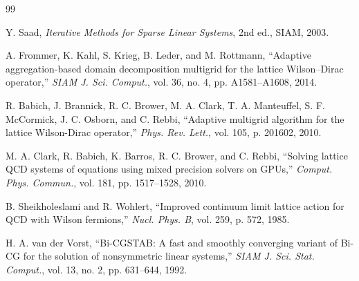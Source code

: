 \documentclass[11pt,a4paper]{article}
\begin{document}

\begin{thebibliography}{99}

Y. Saad, \textit{Iterative Methods for Sparse Linear Systems}, 2nd ed., SIAM, 2003.

A. Frommer, K. Kahl, S. Krieg, B. Leder, and M. Rottmann,
``Adaptive aggregation-based domain decomposition multigrid for the lattice Wilson--Dirac operator,''
\textit{SIAM J. Sci. Comput.}, vol. 36, no. 4, pp. A1581--A1608, 2014.

R. Babich, J. Brannick, R. C. Brower, M. A. Clark, T. A. Manteuffel, S. F. McCormick, J. C. Osborn, and C. Rebbi,
``Adaptive multigrid algorithm for the lattice Wilson-Dirac operator,''
\textit{Phys. Rev. Lett.}, vol. 105, p. 201602, 2010.

M. A. Clark, R. Babich, K. Barros, R. C. Brower, and C. Rebbi,
``Solving lattice QCD systems of equations using mixed precision solvers on GPUs,''
\textit{Comput. Phys. Commun.}, vol. 181, pp. 1517--1528, 2010.

B. Sheikholeslami and R. Wohlert,
``Improved continuum limit lattice action for QCD with Wilson fermions,''
\textit{Nucl. Phys. B}, vol. 259, p. 572, 1985.

H. A. van der Vorst,
``Bi-CGSTAB: A fast and smoothly converging variant of Bi-CG for the solution of nonsymmetric linear systems,''
\textit{SIAM J. Sci. Stat. Comput.}, vol. 13, no. 2, pp. 631--644, 1992.

\end{thebibliography}
\end{document}
